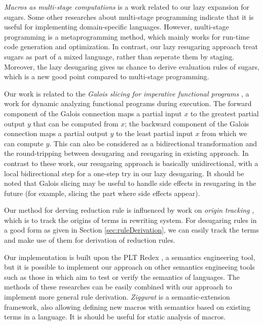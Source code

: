 \emph{Macros as multi-stage computations} \cite{multistage} is a work related to our lazy expansion for sugars. Some other researches \cite{modularstaging} about multi-stage programming \cite{MSP} indicate that it is useful for implementing domain-specific languages. However, multi-stage programming is a metaprogramming method, which mainly works for run-time code generation and optimization. In contrast, our lazy resugaring approach treat sugars as part of a mixed language, rather than seperate them by staging. Moreover, the lazy desugaring gives us chance to derive evaluation rules of sugars, which is a new good point compared to multi-stage programming.

Our work is related to the \emph{Galois slicing for imperative functional programs} \cite{slicing}, a work for dynamic analyzing functional programs during execution. The forward component of the Galois connection maps a partial input $x$ to the greatest partial output $y$ that can be computed from $x$; the backward component of the Galois connection maps a partial output $y$ to the least partial input $x$ from which we can compute $y$.
This can also be considered as a bidirectional transformation \cite{bx,lens07} and the round-tripping between desugaring and resugaring in existing approach. In contrast to these work, our resugaring approach is basically unidirectional, with a local bidirectional step
for a one-step try in our lazy desugaring. It should be noted that Galois slicing may be useful to handle side effects in resugaring in the future (for example, slicing the part where side effects appear).

Our method for derving reduction rule is influenced by work on \emph{origin tracking} \cite{origintracking}, which is to  track the origins of terms in rewriting system.
For desugaring rules in a good form as given in Section \ref{sec:ruleDerivation}, we can easily track the terms and make use of them for derivation of reduction rules. 
%

Our implementation is built upon the PLT Redex \cite{SEwPR}, a semantics engineering tool, but it is possible to implement our approach on other semantics engineeing tools such as those in \cite{dynsem,Ksemantic} which aim to test or verify the semantics of languages. The methods of these researches can be easily combined with our approach to implement more general rule derivation. \emph{Ziggurat} \cite{Ziggurat} is a semantic-extension framework, also allowing defining new macros with semantics based on existing terms in a language. It is should be useful for static analysis of macros.

